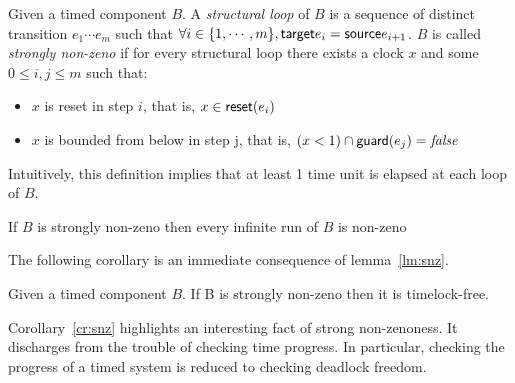 \begin{definition}
  Given a timed component $B$. A \emph{structural loop} of $B$ is a sequence 
  of distinct transition $e_1\cdots e_m$ such that $\forall i\in\{1,\cdots,m
  \},\textsf{target}{e_i}= \textsf{source}{e_{i+1}}$. $B$ is called \emph{strongly non-zeno} 
  if for every structural loop there exists a clock $x$ and some $0\le i,j
  \le m$ such that:
  \begin{itemize}
    \item $x$ is reset in step $i$, that is, $x\in\textsf{reset}(e_i)$
    \item $x$ is bounded from below in step j, that is, $(x<1)\cap\textsf{guard}(e_j)
      =\textnormal{\textit{false}}$
  \end{itemize}
\end{definition}
Intuitively, this definition implies that at least 1 time unit is elapsed 
at each loop of $B$.

\begin{lemma}[\cite{}]\label{lm:snz}
  If $B$ is strongly non-zeno then every infinite run of $B$ is non-zeno
\end{lemma}

The following corollary is an immediate consequence of lemma~\ref{lm:snz}. 
\begin{corollary}\label{cr:snz}
Given a timed component $B$. If B is strongly non-zeno then it is 
  timelock-free.
\end{corollary}

Corollary~\ref{cr:snz} highlights an interesting fact of strong non-zenoness.
It discharges from the trouble of checking time progress. In particular, checking
the progress of a timed system is reduced to checking deadlock freedom.

